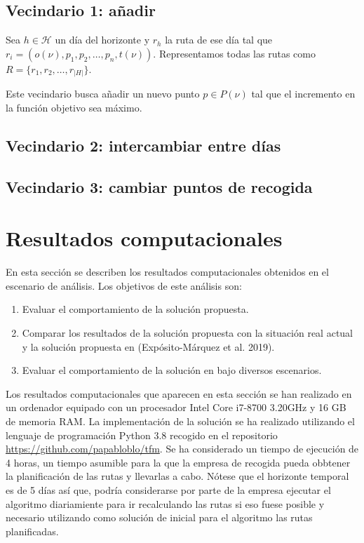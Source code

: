 \documentclass[
]{article}
\providecommand{\tightlist}{%
  \setlength{\itemsep}{0pt}\setlength{\parskip}{0pt}}
\begin{document}
\hypertarget{vecindario-1-auxf1adir}{%
\subsection{Vecindario 1: añadir}\label{vecindario-1-auxf1adir}}

Sea \(h\in\mathcal{H}\) un día del horizonte y \(r_h\) la ruta de ese
día tal que \(r_i=(o(\nu), p_1, p_2, \ldots, p_n, t(\nu))\).
Representamos todas las rutas como \(R=\{r_1, r_2,\ldots, r_{|H|}\}\).

Este vecindario busca añadir un nuevo punto \(p\in P(\nu)\) tal que el
incremento en la función objetivo sea máximo.

\hypertarget{vecindario-2-intercambiar-entre-duxedas}{%
\subsection{Vecindario 2: intercambiar entre
días}\label{vecindario-2-intercambiar-entre-duxedas}}

\hypertarget{vecindario-3-cambiar-puntos-de-recogida}{%
\subsection{Vecindario 3: cambiar puntos de
recogida}\label{vecindario-3-cambiar-puntos-de-recogida}}

\hypertarget{resultados-computacionales}{%
\section{Resultados computacionales}\label{resultados-computacionales}}

En esta sección se describen los resultados computacionales obtenidos en
el escenario de análisis. Los objetivos de este análisis son:

\begin{enumerate}
\def\labelenumi{\arabic{enumi}.}
\tightlist
\item
  Evaluar el comportamiento de la solución propuesta.
\item
  Comparar los resultados de la solución propuesta con la situación real
  actual y la solución propuesta en (Expósito-Márquez et al. 2019).
\item
  Evaluar el comportamiento de la solución en bajo diversos escenarios.
\end{enumerate}

Los resultados computacionales que aparecen en esta sección se han
realizado en un ordenador equipado con un procesador Intel Core i7-8700
3.20GHz y 16 GB de memoria RAM. La implementación de la solución se ha
realizado utilizando el lenguaje de programación Python 3.8 recogido en
el repositorio \url{https://github.com/papabloblo/tfm}. Se ha
considerado un tiempo de ejecución de 4 horas, un tiempo asumible para
la que la empresa de recogida pueda obbtener la planificación de las
rutas y llevarlas a cabo. Nótese que el horizonte temporal es de 5 días
así que, podría considerarse por parte de la empresa ejecutar el
algoritmo diariamiente para ir recalculando las rutas si eso fuese
posible y necesario utilizando como solución de inicial para el
algoritmo las rutas planificadas.
\end{document}
